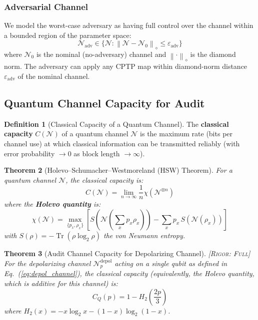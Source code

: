 \documentclass[11pt,a4paper]{article}
\theoremstyle{plain}
\newtheorem{theorem}{Theorem}[section]
\theoremstyle{definition}
\newtheorem{definition}[theorem]{Definition}
\theoremstyle{remark}
\DeclareMathOperator{\Tr}{Tr}
\newcommand{\cN}{\mathcal{N}}
\newcommand{\norm}[1]{\left\lVert#1\right\rVert}
\newcommand{\rigorFull}{\textsc{[Rigor: Full]}}
\begin{document}
\subsubsection{Adversarial Channel}

We model the worst-case adversary as having full control over the channel
within a bounded region of the parameter space:
\[
\cN_{\text{adv}} \in \{\cN : \norm{\cN - \cN_0}_{\diamond} \leq \varepsilon_{\text{adv}}\}
\]
where $\cN_0$ is the nominal (no-adversary) channel and
$\norm{\cdot}_{\diamond}$ is the diamond norm. The adversary can apply
any CPTP map within diamond-norm distance $\varepsilon_{\text{adv}}$ of
the nominal channel.

\subsection{Quantum Channel Capacity for Audit}
\label{sec:channel_capacity}

\begin{definition}[Classical Capacity of a Quantum Channel]
The \textbf{classical capacity} $C(\cN)$ of a quantum channel $\cN$ is the
maximum rate (bits per channel use) at which classical information can be
transmitted reliably (with error probability $\to 0$ as block length $\to \infty$).
\end{definition}

\begin{theorem}[Holevo--Schumacher--Westmoreland (HSW) Theorem]
\label{thm:hsw}
For a quantum channel $\cN$, the classical capacity is:
\[
C(\cN) = \lim_{n \to \infty} \frac{1}{n} \chi(\cN^{\otimes n})
\]
where the \textbf{Holevo quantity} is:
\[
\chi(\cN) = \max_{\{p_x, \rho_x\}} \left[
S\left(\cN\left(\sum_x p_x \rho_x\right)\right) -
\sum_x p_x \, S(\cN(\rho_x))
\right]
\]
with $S(\rho) = -\Tr(\rho \log_2 \rho)$ the von Neumann entropy.
\end{theorem}

\begin{theorem}[Audit Channel Capacity for Depolarizing Channel]
\label{thm:audit_capacity}
\rigorFull
For the depolarizing channel $\cN_p^{\text{depol}}$ acting on a single qubit
as defined in Eq.~(\ref{eq:depol_channel}), the classical capacity
(equivalently, the Holevo quantity, which is additive for this channel) is:
\[
C_Q(p) = 1 - H_2\!\left(\frac{2p}{3}\right)
\]
where $H_2(x) = -x\log_2 x - (1-x)\log_2(1-x)$.
\end{theorem}
\end{document}
